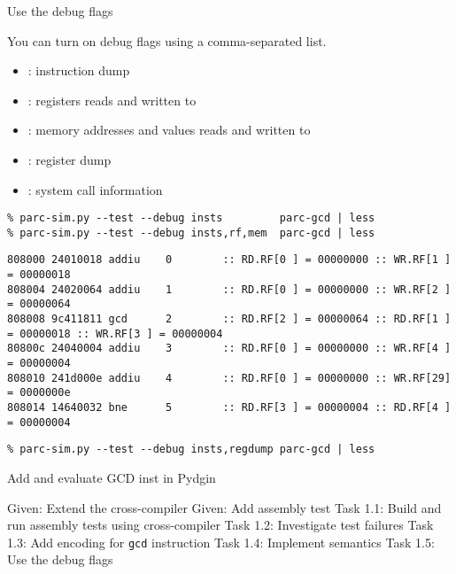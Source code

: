 \begin{task}
\begin{frame}[fragile]{Use the debug flags}

{}You can turn on debug flags using a comma-separated list.

\begin{itemize}
  \item {}: instruction dump
  \item {}: registers reads and written to
  \item {}: memory addresses and values reads and written to
  \item {}: register dump
  \item {}: system call information
\end{itemize}

\begin{Verbatim}[commandchars=\\\{\}]
% cd \midtilde/pydgin-tut/parc/asm_tests/build
% parc-sim.py --test --debug insts         parc-gcd | less
% parc-sim.py --test --debug insts,rf,mem  parc-gcd | less
\end{Verbatim}

{\tiny
\begin{verbatim}
808000 24010018 addiu    0        :: RD.RF[0 ] = 00000000 :: WR.RF[1 ] = 00000018
808004 24020064 addiu    1        :: RD.RF[0 ] = 00000000 :: WR.RF[2 ] = 00000064
808008 9c411811 gcd      2        :: RD.RF[2 ] = 00000064 :: RD.RF[1 ] = 00000018 :: WR.RF[3 ] = 00000004
80800c 24040004 addiu    3        :: RD.RF[0 ] = 00000000 :: WR.RF[4 ] = 00000004
808010 241d000e addiu    4        :: RD.RF[0 ] = 00000000 :: WR.RF[29] = 0000000e
808014 14640032 bne      5        :: RD.RF[3 ] = 00000004 :: RD.RF[4 ] = 00000004
\end{verbatim}}

\begin{verbatim}
% parc-sim.py --test --debug insts,regdump parc-gcd | less
\end{verbatim}

\end{frame}
\end{task}


\begin{frame}{ Add and evaluate GCD inst in Pydgin}
\begin{cbxlist}
  \1 Given: Extend the cross-compiler
  \1 Given: Add assembly test
  \1 Task 1.1: Build and run assembly tests using cross-compiler
  \1 Task 1.2: Investigate test failures
  \1 Task 1.3: Add encoding for \texttt{gcd} instruction
  \1 Task 1.4: Implement semantics
  \1 Task 1.5: Use the debug flags
  \1 
  \1 
  \1 
\end{cbxlist}
\end{frame}

